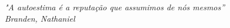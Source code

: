 \begin{epigrafe}
    \vspace*{\fill}
	\begin{flushright}

		\textit{"A autoestima é a reputação que assumimos de nós mesmos” \\
		Branden, Nathaniel}
	\end{flushright}
\end{epigrafe}
